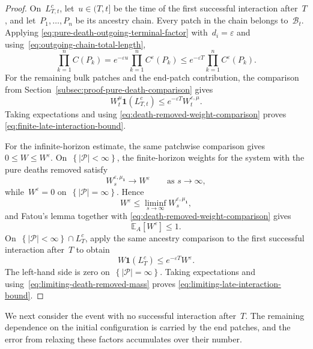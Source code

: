 \documentclass[EJP,preprint,NODS,nobera]{ejpecp}
\newcommand{\E}{\mathbb{E}}
\newcommand{\bb}[1]{\left(#1\right)}
\newcommand{\Cb}[1]{\left[#1\right]}
\newcommand{\cb}[1]{\left\{#1\right\}}
\newcommand{\abs}[1]{\left|#1\right|}
\newcommand{\ind}{\mathbf{1}}
\newcommand{\mb}[1]{\mathbf{#1}}
\begin{document}
\begin{proof}
On~$L_{T,t}^c$, let~$u\in(T,t]$ be the time of the first successful interaction
after~$T$, and let~$P_1,\ldots,P_n$ be its ancestry chain. Every patch in the
chain belongs to~$\mathcal B_t$. Applying
\eqref{eq:pure-death-outgoing-terminal-factor} with~$d_i=\varepsilon$ and
using~\eqref{eq:outgoing-chain-total-length},
\begin{equation*}
\prod_{k=1}^n C(P_k)
=
e^{-\varepsilon u}
\prod_{k=1}^n C^\varepsilon(P_k)
\leq
e^{-\varepsilon T}
\prod_{k=1}^n C^\varepsilon(P_k).
\end{equation*}
For the remaining bulk patches and the end-patch contribution, the comparison
from Section~\ref{subsec:proof-pure-death-comparison} gives
\begin{equation*}
W_t^\mu\ind\bb{L_{T,t}^c}
\leq
e^{-\varepsilon T}
W_t^{\varepsilon,\mu}.
\end{equation*}
Taking expectations and using
\eqref{eq:death-removed-weight-comparison} proves
\eqref{eq:finite-late-interaction-bound}.

For the infinite-horizon estimate, the same patchwise comparison gives~$0\leq W\leq W^\varepsilon$. On~$\cb{\abs{\mathcal P}<\infty}$,
the finite-horizon weights for the system with the pure deaths removed satisfy
\begin{equation*}
W_s^{\varepsilon,\mu_{\mb 1}}
\longrightarrow
W^\varepsilon
\qquad
\text{as }s\to\infty,
\end{equation*}
while~$W^\varepsilon=0$ on~$\cb{\abs{\mathcal P}=\infty}$. Hence
\begin{equation*}
W^\varepsilon
\leq
\liminf_{s\to\infty}
W_s^{\varepsilon,\mu_{\mb 1}},
\end{equation*}
and Fatou's lemma together with
\eqref{eq:death-removed-weight-comparison} gives
\begin{equation}
\label{eq:limiting-death-removed-mass}
\E_A\Cb{W^\varepsilon}
\leq1.
\end{equation}
On~$\cb{\abs{\mathcal P}<\infty}\cap L_T^c$, apply the same ancestry
comparison to the first successful interaction after~$T$ to obtain
\begin{equation*}
W\ind\bb{L_T^c}
\leq
e^{-\varepsilon T}W^\varepsilon.
\end{equation*}
The left-hand side is zero on~$\cb{\abs{\mathcal P}=\infty}$. Taking
expectations and using~\eqref{eq:limiting-death-removed-mass} proves
\eqref{eq:limiting-late-interaction-bound}.
\end{proof}

We next consider the event with no successful interaction after~$T$. The
remaining dependence on the initial configuration is carried by the end
patches, and the error from relaxing these factors accumulates over their
number.
\end{document}
